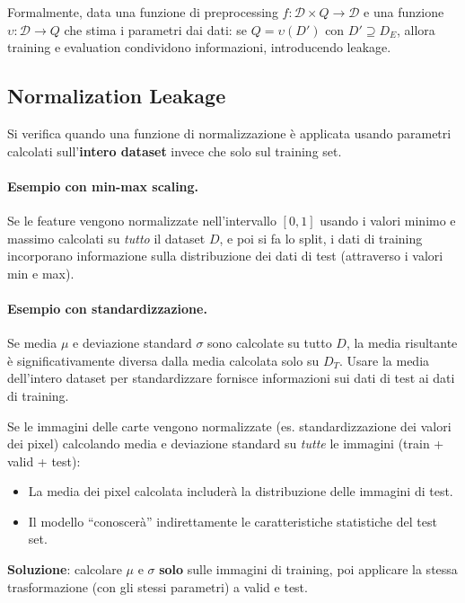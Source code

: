 \documentclass[a4paper,12pt]{article}
\begin{document}
Formalmente, data una funzione di preprocessing $f: \mathcal{D} \times Q \to \mathcal{D}$ e una funzione $\upsilon: \mathcal{D} \to Q$ che stima i parametri dai dati: se $Q = \upsilon(D')$ con $D' \supseteq D_E$, allora training e evaluation condividono informazioni, introducendo leakage.

\subsection{Normalization Leakage}

Si verifica quando una funzione di normalizzazione è applicata usando parametri calcolati sull'\textbf{intero dataset} invece che solo sul training set.

\paragraph{Esempio con min-max scaling.} Se le feature vengono normalizzate nell'intervallo $[0,1]$ usando i valori minimo e massimo calcolati su \emph{tutto} il dataset $D$, e poi si fa lo split, i dati di training incorporano informazione sulla distribuzione dei dati di test (attraverso i valori min e max).

\paragraph{Esempio con standardizzazione.} Se media $\mu$ e deviazione standard $\sigma$ sono calcolate su tutto $D$, la media risultante è significativamente diversa dalla media calcolata solo su $D_T$. Usare la media dell'intero dataset per standardizzare fornisce informazioni sui dati di test ai dati di training.

\begin{esempio}
Se le immagini delle carte vengono normalizzate (es. standardizzazione dei valori dei pixel) calcolando media e deviazione standard su \emph{tutte} le immagini (train + valid + test):
\begin{itemize}[noitemsep]
    \item La media dei pixel calcolata includerà la distribuzione delle immagini di test.
    \item Il modello ``conoscerà'' indirettamente le caratteristiche statistiche del test set.
\end{itemize}

\textbf{Soluzione}: calcolare $\mu$ e $\sigma$ \textbf{solo} sulle immagini di training, poi applicare la stessa trasformazione (con gli stessi parametri) a valid e test.
\end{esempio}
\end{document}
